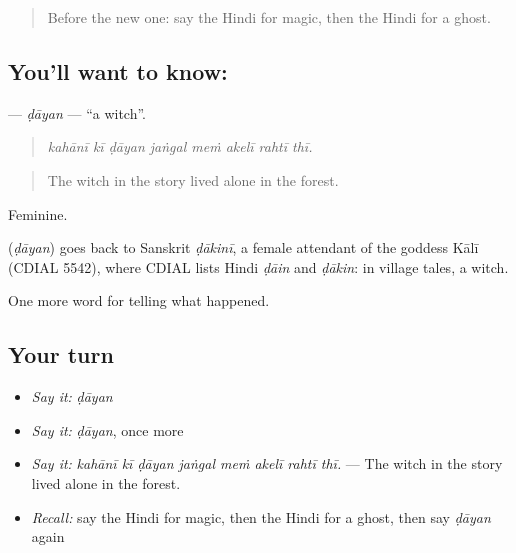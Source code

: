 \label{lesson:HI-C338-dayan}



\begin{quote}
Before the new one: say the Hindi for magic, then the Hindi for a ghost.
\end{quote}

\subsection*{You'll want to know: }
\textbf{} — \emph{ḍāyan} — \textquotedblleft{}a witch\textquotedblright{}.

\begin{quote}
       
\end{quote}

\begin{quote}
\emph{kahānī kī ḍāyan jaṅgal meṁ akelī rahtī thī.}
\end{quote}

\begin{quote}
The witch in the story lived alone in the forest.
\end{quote}

Feminine.

\begin{cousinweb}
\textbf{} (\emph{ḍāyan}) goes back to Sanskrit \emph{ḍākinī}, a female attendant of the goddess Kālī (CDIAL 5542), where CDIAL lists Hindi \emph{ḍāin} and \emph{ḍākin}: in village tales, a witch.
\end{cousinweb}

\begin{grammarlens}[title={What you've built}]
One more word for telling what happened.
\end{grammarlens}

\subsection*{Your turn}
\begin{itemize}
\raggedright
  \item \emph{Say it:} \emph{ḍāyan}
  \item \emph{Say it:} \emph{ḍāyan}, once more
  \item \emph{Say it:} \emph{kahānī kī ḍāyan jaṅgal meṁ akelī rahtī thī.} — The witch in the story lived alone in the forest.
  \item \emph{Recall:} say the Hindi for magic, then the Hindi for a ghost, then say \emph{ḍāyan} again
\end{itemize}

